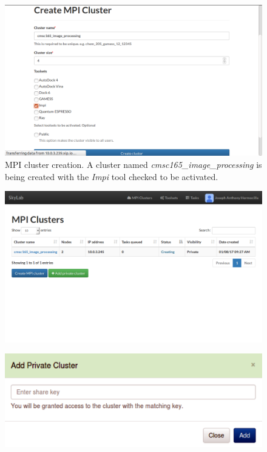 		
\begin{figure}			
	\includegraphics[scale=0.93]{./images/n_create_cluster_impi_printed.png}
	\caption{\label{fig:mpicreate}MPI cluster creation. A cluster named \textit{cmsc165\_image\_processing} is being created with the \textit{Impi} tool checked to be activated.}			
\end{figure}	
	
\begin{figure}			
	\includegraphics{./images/n_active_cluster_printed.png}
\end{figure}
		
\begin{figure}			
	\includegraphics[scale=0.50]{./images/add_private_cluster_2.png}		
\end{figure}	
		
